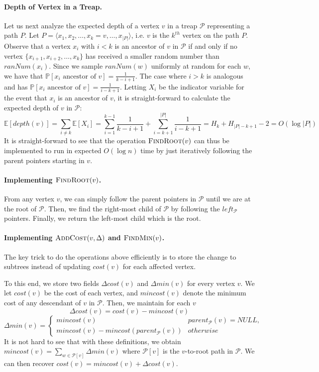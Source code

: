 \paragraph{Depth of Vertex in a Treap.} Let us next analyze the expected depth of a vertex $v$ in a treap $\mathcal{P}$ representing a path $P$. Let $P = \langle x_1, x_2, \dots, x_k = v, \dots, x_{|P|}\rangle$, i.e. $v$ is the $k^{th}$ vertex on the path $P$. Observe that a vertex $x_i$ with $i < k$ is an ancestor of $v$ in $\mathcal{P}$ if and only if no vertex $\{x_{i+1}, x_{i+2}, \dots, x_k\}$ has received a smaller random number than $ranNum(x_i)$. Since we sample $ranNum(w)$ uniformly at random for each $w$, we have that $\mathbb{P}[x_i \text{ ancestor of } v] = \frac{1}{k-i+1}$. The case where $i > k$ is analogous and has $\mathbb{P}[x_i \text{ ancestor of } v] = \frac{1}{i-k+1}$. Letting $X_i$ be the indicator variable for the event that $x_i$ is an ancestor of $v$, it is straight-forward to calculate the expected depth of $v$ in $\mathcal{P}$:
\[
    \mathbb{E}[depth(v)] = \sum_{i \neq k} \mathbb{E}[X_i] =  \sum_{i = 1}^{k-1}\frac{1}{k-i+1} + \sum_{i = k+1}^{|P|} \frac{1}{i-k+1} = H_k + H_{|P|-k+1} - 2 = O(\log |P|)
\]
It is straight-forward to see that the operation $\textsc{FindRoot}(v)$ can thus be implemented to run in expected $O(\log n)$ time by just iteratively following the parent pointers starting in $v$.

\paragraph{Implementing $\textsc{FindRoot}(v)$.} From any vertex $v$, we can simply follow the parent pointers in $\mathcal{P}$ until we are at the root of $\mathcal{P}$. Then, we find the right-most child of $\mathcal{P}$ by following the $left_{\mathcal{P}}$ pointers. Finally, we return the left-most child which is the root.

\paragraph{Implementing $\textsc{AddCost}(v, \Delta)$ and $\textsc{FindMin}(v)$.} The key trick to do the operations above efficiently is to store the change to subtrees instead of updating $cost(v)$ for each affected vertex. 

To this end, we store two fields $\Delta cost(v)$ and $\Delta min(v)$ for every vertex $v$. We let $cost(v)$ be the cost of each vertex, and $mincost(v)$ denote the minimum cost of any descendant of $v$ in $\mathcal{P}$. Then, we maintain for each $v$
\[
    \Delta cost(v) = cost(v) - mincost(v)
\]
\[
    \Delta min(v) = \begin{cases}
    mincost(v) & parent_{\mathcal{P}}(v) = NULL, \\
    mincost(v) - mincost(parent_{\mathcal{P}}(v)) & otherwise\end{cases}
\]
It is not hard to see that with these definitions, we obtain $mincost(v) = \sum_{w \in \mathcal{P}[v]} \Delta min(v)$ where $\mathcal{P}[v]$ is the $v$-to-root path in $\mathcal{P}$. We can then recover $cost(v) = mincost(v) + \Delta cost(v)$. 


